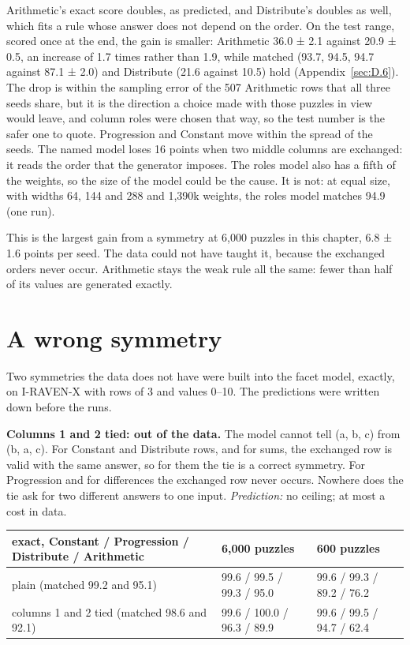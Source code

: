 Arithmetic's exact score doubles, as predicted, and Distribute's doubles as well, which fits a rule whose answer does not depend on the order. On the test range, scored once at the end, the gain is smaller: Arithmetic 36.0 ± 2.1 against 20.9 ± 0.5, an increase of 1.7 times rather than 1.9, while matched (93.7, 94.5, 94.7 against 87.1 ± 2.0) and Distribute (21.6 against 10.5) hold (Appendix~\ref{sec:D.6}). The drop is within the sampling error of the 507 Arithmetic rows that all three seeds share, but it is the direction a choice made with those puzzles in view would leave, and column roles were chosen that way, so the test number is the safer one to quote. Progression and Constant move within the spread of the seeds. The named model loses 16 points when two middle columns are exchanged: it reads the order that the generator imposes. The roles model also has a fifth of the weights, so the size of the model could be the cause. It is not: at equal size, with widths 64, 144 and 288 and 1,390k weights, the roles model matches 94.9 (one run).

This is the largest gain from a symmetry at 6,000 puzzles in this chapter, 6.8 ± 1.6 points per seed. The data could not have taught it, because the exchanged orders never occur. Arithmetic stays the weak rule all the same: fewer than half of its values are generated exactly.

\section{A wrong symmetry}\label{sec:6.7}

Two symmetries the data does not have were built into the facet model, exactly, on I-RAVEN-X with rows of 3 and values 0–10. The predictions were written down before the runs.

\textbf{Columns 1 and 2 tied: out of the data.} The model cannot tell (a, b, c) from (b, a, c). For Constant and Distribute rows, and for sums, the exchanged row is valid with the same answer, so for them the tie is a correct symmetry. For Progression and for differences the exchanged row never occurs. Nowhere does the tie ask for two different answers to one input. \emph{Prediction:} no ceiling; at most a cost in data.

\begin{center}\small
\begin{tabularx}{\linewidth}{@{}YYY@{}}
\toprule
exact, Constant / Progression / Distribute / Arithmetic & 6,000 puzzles & 600 puzzles \\
\midrule
plain (matched 99.2 and 95.1) & 99.6 / 99.5 / 99.3 / 95.0 & 99.6 / 99.3 / 89.2 / 76.2 \\
columns 1 and 2 tied (matched 98.6 and 92.1) & 99.6 / 100.0 / 96.3 / 89.9 & 99.6 / 99.5 / 94.7 / 62.4 \\
\bottomrule
\end{tabularx}
\end{center}

